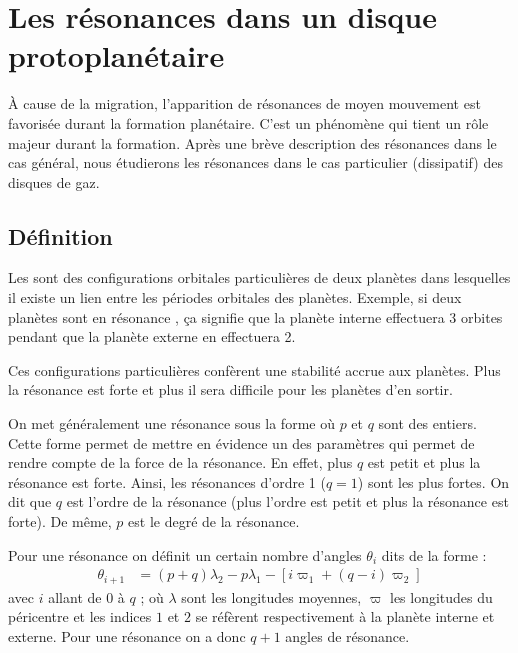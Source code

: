 

\section{Les résonances dans un disque protoplanétaire}
À cause de la migration, l'apparition de résonances de moyen mouvement est favorisée durant la formation planétaire. C'est un phénomène qui tient un rôle majeur durant la formation. Après une brève description des résonances dans le cas général, nous étudierons les résonances dans le cas particulier (dissipatif) des disques de gaz. 

\subsection{Définition}
Les  sont des configurations orbitales particulières de deux planètes
dans lesquelles il existe un lien entre les périodes orbitales des planètes. Exemple, si deux planètes sont en résonance
, ça signifie que la planète interne effectuera 3 orbites pendant que la planète externe en effectuera 2.

Ces configurations particulières confèrent une stabilité accrue aux planètes. Plus la résonance est forte et plus il sera
difficile pour les planètes d'en sortir.

\bigskip

On met généralement une résonance sous la forme  où $p$ et $q$ sont des entiers. Cette forme permet de mettre en
évidence un des paramètres qui permet de rendre compte de la force de la résonance. En effet, plus $q$ est petit et plus la
résonance est forte. Ainsi, les résonances d'ordre 1 ($q=1$) sont les plus fortes. On dit que $q$ est l'ordre de la résonance
(plus l'ordre est petit et plus la résonance est forte). De même, $p$ est le degré de la résonance.

Pour une résonance  on définit un certain nombre d'angles $\theta_i$ dits  de la forme :
\begin{align}
\theta_{i+1} &=(p+q)\lambda_2 -p\lambda_1 - \left[i\varpi_{1} + (q-i)\varpi_2\right]
\end{align}
avec $i$ allant de $0$ à $q$ ; où $\lambda$ sont les longitudes moyennes, $\varpi$ les longitudes du péricentre et les indices
$1$ et $2$ se réfèrent respectivement à la planète interne et externe. Pour une résonance  on a donc $q+1$ angles
de résonance.

